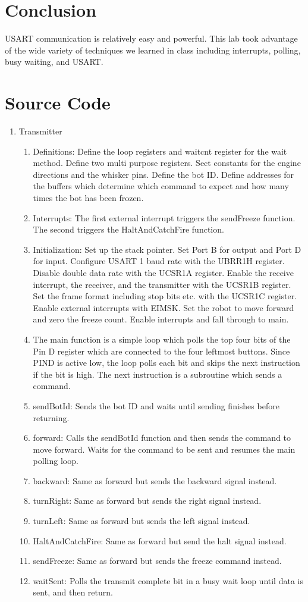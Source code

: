 \documentclass[12pt,letterpaper]{article}
\begin{document}
\section{Conclusion}
USART communication is relatively easy and powerful. This lab took advantage of the wide variety of techniques we learned in class including interrupts, polling, busy waiting, and USART.

\section{Source Code}

\begin{enumerate}
\item Transmitter
\begin{enumerate}

\item Definitions: Define the loop registers and waitcnt register for the wait method. Define two multi purpose registers. Sect constants for the engine directions and the whisker pins. Define the bot ID. Define addresses for the buffers which determine which command to expect and how many times the bot has been frozen.
\item Interrupts: The first external interrupt triggers the sendFreeze function. The second triggers the HaltAndCatchFire function.
\item Initialization: Set up the stack pointer. Set Port B for output and Port D for input. Configure USART 1 baud rate with the UBRR1H register. Disable double data rate with the UCSR1A register. Enable the receive interrupt, the receiver, and the transmitter with the UCSR1B register. Set the frame format including stop bits etc. with the UCSR1C register. Enable external interrupts with EIMSK. Set the robot to move forward and zero the freeze count. Enable interrupts and fall through to main.
\item The main function is a simple loop which polls the top four bits of the Pin D register which are connected to the four leftmost buttons. Since PIND is active low, the loop polls each bit and skips the next instruction if the bit is high. The next instruction is a subroutine which sends a command.
\item sendBotId: Sends the bot ID and waits until sending finishes before returning.
\item forward: Calls the sendBotId function and then sends the command to move forward. Waits for the command to be sent and resumes the main polling loop.
\item backward: Same as forward but sends the backward signal instead.
\item turnRight: Same as forward but sends the  right signal instead.
\item turnLeft: Same as forward but sends the left signal instead.
\item HaltAndCatchFire: Same as forward but send the halt signal instead.
\item sendFreeze: Same as forward but sends the freeze command instead.
\item waitSent: Polls the transmit complete bit in a busy wait loop until data is sent, and then return.


\end{enumerate}
\end{enumerate}
\end{document}
